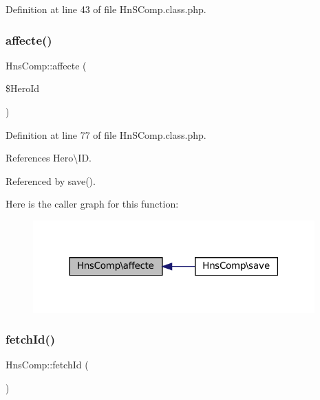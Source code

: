 Definition at line 43 of file Hn\+S\+Comp.\+class.\+php.

\mbox{\label{class_hns_comp_adc2876b97085870a3e10bdc3fa9931a5}} 
\subsubsection{\texorpdfstring{affecte()}{affecte()}}
{\footnotesize\ttfamily Hns\+Comp\+::affecte (\begin{DoxyParamCaption}\item[{}]{\$\+Hero\+Id }\end{DoxyParamCaption})\hspace{0.3cm}{\ttfamily [private]}}



Definition at line 77 of file Hn\+S\+Comp.\+class.\+php.



References Hero\textbackslash{}\+ID.



Referenced by save().

Here is the caller graph for this function\+:\nopagebreak
\begin{figure}[H]
\begin{center}
\leavevmode
\includegraphics[width=307pt]{class_hns_comp_adc2876b97085870a3e10bdc3fa9931a5_icgraph}
\end{center}
\end{figure}
\mbox{\label{class_hns_comp_aa81a8b1cb6f2ca42b2d39beeb3d36f0d}} 
\subsubsection{\texorpdfstring{fetch\+Id()}{fetchId()}}
{\footnotesize\ttfamily Hns\+Comp\+::fetch\+Id (\begin{DoxyParamCaption}{ }\end{DoxyParamCaption})\hspace{0.3cm}{\ttfamily [private]}}



